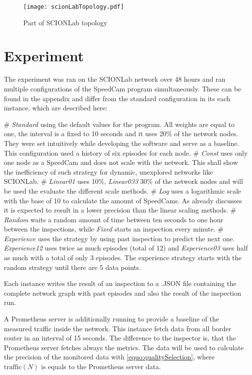 \documentclass[thesis.tex]{subfiles}
\begin{document}
\begin{figure}
	\centering
	\texttt{[image: scionLabTopology.pdf]}
	\caption{Part of SCIONLab topology}
	\label{fig:eva:scionLabTopo}
\end{figure}

\section{Experiment}

The experiment was ran on the SCIONLab network over 48 hours and ran multiple configurations of the SpeedCam program simultaneously. These can be found in the appendix  and differ from the standard configuration in its each instance, which are described here:

\begin{easylist}
	# \textit{Standard} using the default values for the program. All weights are equal to one, the interval is a fixed to 10 seconds and it uses 20\% of the network nodes. They were set intuitively while developing the software and serve as a baseline. This configuration used a history of six episodes for each node.
	# \textit{Const} uses only one node as a SpeedCam and does not scale with the network. This shall show the inefficiency of such strategy for dynamic, unexplored networks like SCIONLab.
	# \textit{Linear01} uses 10\%, \textit{Linear033} 30\% of the network nodes and will be used the evaluate the different scale methods.
	# \textit{Log} uses a logarithmic scale with the base of 10 to calculate the amount of SpeedCams. As already discusses it is expected to result in a lower precision than the linear scaling methods.
	# \textit{Random} waits a random amount of time between ten seconds to one hour between the inspections, while \textit{Fixed} starts an inspection every minute. 
	# \textit{Experience} uses the strategy by using past inspection to predict the next one. \textit{Experience12} uses twice as much episodes (total of 12) and \textit{Experience03} uses half as much with a total of only 3 episodes. The experience strategy starts with the random strategy until there are 5 data points.		
\end{easylist}

Each instance writes the result of an inspection to a .JSON file containing the complete network graph with past episodes and also the result of the inspection run. 

A Prometheus server is additionally running to provide a baseline of the measured traffic inside the network. This instance fetch data from all border router in an interval of 15 seconds. The difference to the inspector is, that the Prometheus server fetches always the metrics. The data will be used to calculate the precision of the monitored data with \autoref{equo:qualitySelection}, where $\text{traffic}(N)$ is equals to the Prometheus server data. 
\end{document}
